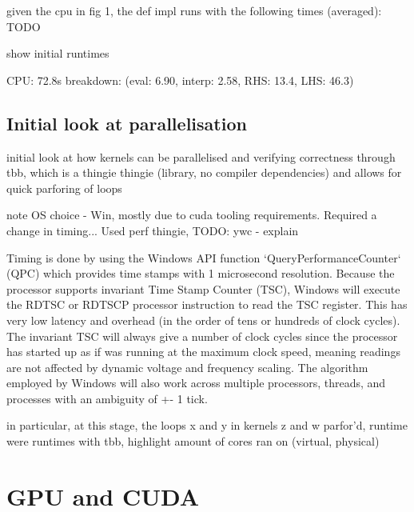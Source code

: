 \documentclass[11pt, oneside, a4paper]{article}
\begin{document}
given the cpu in fig 1, the def impl runs with the following times (averaged): TODO

show initial runtimes

CPU: 72.8s breakdown: (eval: 6.90, interp: 2.58, RHS: 13.4, LHS: 46.3)




\subsection{Initial look at parallelisation} %
\label{sub:initial_look_at_parallelisation}

initial look at how kernels can be parallelised and verifying correctness through tbb, which is a thingie thingie (library, no compiler dependencies)
and allows for quick parforing of loops

note OS choice - Win, mostly due to cuda tooling requirements. Required a change in timing... Used perf thingie, TODO: ywc - explain


Timing is done by using the Windows API function `QueryPerformanceCounter` (QPC) which provides time stamps with 1 microsecond resolution. Because the processor supports invariant Time Stamp Counter (TSC), Windows will execute the RDTSC or RDTSCP processor instruction to read the TSC register. This has very low latency and overhead (in the order of tens or hundreds of clock cycles). The invariant TSC will always give a number of clock cycles since the processor has started up as if was running at the maximum clock speed, meaning readings are not affected by dynamic voltage and frequency scaling. The algorithm employed by Windows will also work across multiple processors, threads, and processes with an ambiguity of +- 1 tick.



in particular, at this stage, the loops x and y in kernels z and w parfor'd, runtime were
runtimes with tbb, highlight amount of cores ran on (virtual, physical)






\section{GPU and CUDA} %
\label{sec:gpu_and_cuda}
\end{document}
